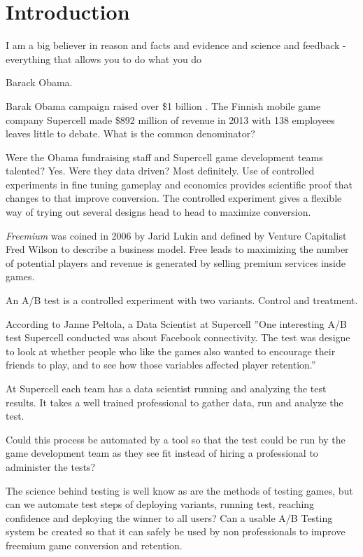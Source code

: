 \documentclass[english,12pt,a4paper,pdftex,elec,utf8]{aaltothesis}
\begin{document}
\section{Introduction}

\thispagestyle{empty}
\epigraph{I am a big believer in reason and facts and evidence and science and feedback - everything that allows you to do what you do} {Barack Obama. \cite{wired-abtesting}}

Barak Obama campaign raised over \$1 billion \cite{nytimes-funding-2012}. The Finnish mobile game company Supercell made \$892 million of revenue in 2013 with 138 employees leaves little to debate\cite{forbes-supercell}. What is the common denominator?

Were the Obama fundraising staff and Supercell game development teams talented? Yes. Were they data driven? Most definitely. Use of controlled experiments in fine tuning gameplay and economics provides scientific proof that changes to that improve conversion. The controlled experiment gives a flexible way of trying out several designs head to head to maximize conversion.

\textit{Freemium} was coined in 2006 by Jarid Lukin and defined by Venture Capitalist Fred Wilson to describe a business model.
Free leads to maximizing the number of potential players and revenue is generated by selling premium services inside games.

An A/B test is a controlled experiment with two variants. Control and treatment.

According to Janne Peltola, a Data Scientist at Supercell ''One interesting A/B test Supercell conducted was about Facebook connectivity. The test was designe to look at whether people who like the games also wanted to encourage their friends to play, and to see how those variables affected player retention.''\cite{hp-vertica}

At Supercell each team has a data scientist running and analyzing the test results. It takes a well trained professional to gather data, run and analyze the test.

Could this process be automated by a tool so that the test could be run by the game development team as they see fit instead of hiring a professional to administer the tests?

The science behind testing is well know as are the methods of testing games, but can we automate test steps of deploying variants, running test, reaching confidence and deploying the winner to all users? Can a usable A/B Testing system be created so that it can safely be used by non professionals to improve freemium game conversion and retention.
\end{document}
